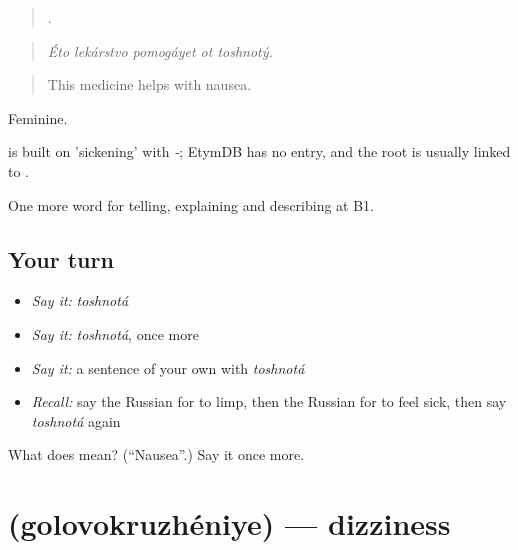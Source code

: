 \begin{quote}
    .
\end{quote}

\begin{quote}
\emph{Éto lekárstvo pomogáyet ot toshnotý.}
\end{quote}

\begin{quote}
This medicine helps with nausea.
\end{quote}

Feminine.

\begin{cousinweb}
\emph{} is built on \emph{} 'sickening' with \emph{-}; EtymDB has no entry, and the root is usually linked to \emph{}.
\end{cousinweb}

\begin{grammarlens}[title={What you've built}]
One more word for telling, explaining and describing at B1.
\end{grammarlens}

\subsection*{Your turn}
\begin{itemize}
\raggedright
  \item \emph{Say it:} \emph{toshnotá}
  \item \emph{Say it:} \emph{toshnotá}, once more
  \item \emph{Say it:} a sentence of your own with \emph{toshnotá}
  \item \emph{Recall:} say the Russian for to limp, then the Russian for to feel sick, then say \emph{toshnotá} again
\end{itemize}

\begin{tcolorbox}[breakable,colback=teal!4,colframe=teal!35!black,title={Before you move on}]
What does  mean? (\textquotedblleft{}Nausea\textquotedblright{}.) Say it once more.
\end{tcolorbox}
\section[\texorpdfstring{\ru{головокружение} (golovokruzhéniye)}{головокружение (golovokruzhéniye)}]{ (golovokruzhéniye) — dizziness}


